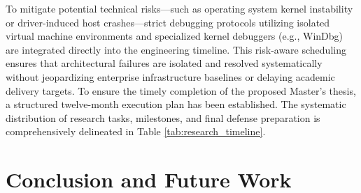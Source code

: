 \documentclass{ieeeaccess}
\begin{document}
To mitigate potential technical risks—such as operating system kernel instability or driver-induced host crashes—strict debugging protocols utilizing isolated virtual machine environments and specialized kernel debuggers (e.g., WinDbg) are integrated directly into the engineering timeline. This risk-aware scheduling ensures that architectural failures are isolated and resolved systematically without jeopardizing enterprise infrastructure baselines or delaying academic delivery targets. To ensure the timely completion of the proposed Master's thesis, a structured twelve-month execution plan has been established. The systematic distribution of research tasks, milestones, and final defense preparation is comprehensively delineated in Table \ref{tab:research_timeline}.

\begin{table}[htbp]
\centering
\caption{Proposed Research Timeline and Execution Schedule}
\label{tab:timeline}
\end{table}



\section{Conclusion and Future Work}
\label{sec:conclusion}
\end{document}

